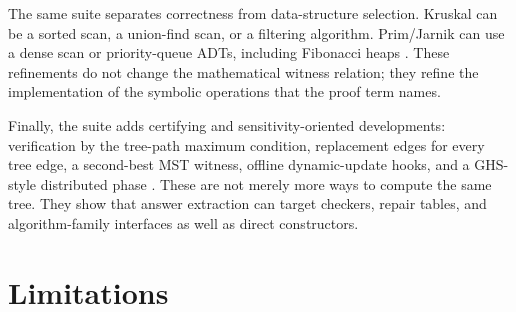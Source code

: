 \documentclass[runningheads]{llncs}
\begin{document}
The same suite separates correctness from data-structure selection.  Kruskal
can be a sorted scan, a union-find scan, or a filtering algorithm.
Prim/Jarnik can use a dense scan or priority-queue ADTs, including Fibonacci
heaps \cite{FredmanTarjan1987}.  These refinements do not change the
mathematical witness relation; they refine the implementation of the symbolic
operations that the proof term names.

Finally, the suite adds certifying and sensitivity-oriented developments:
verification by the tree-path maximum condition, replacement edges for every
tree edge, a second-best MST witness, offline dynamic-update hooks, and a
GHS-style distributed phase
\cite{DixonRauchTarjan1992,Eppstein1994,GallagerHumbletSpira1983}.  These are
not merely more ways to compute the same tree.  They show that answer
extraction can target checkers, repair tables, and algorithm-family interfaces
as well as direct constructors.

\section{Limitations}
\end{document}
